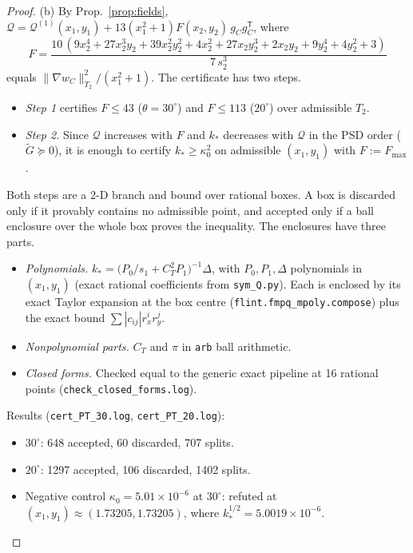 \documentclass[11pt]{article}
\theoremstyle{remark}
\begin{document}
\begin{proof}
(b) By Prop.~\ref{prop:fields}, $\mathcal Q=\mathcal Q^{(1)}(x_1,y_1)+13(x_1^2+1)F(x_2,y_2)\,g_Cg_C^{\mathsf T}$, where
\[
F=\frac{10\,(9x_2^4+27x_2^3y_2+39x_2^2y_2^2+4x_2^2+27x_2y_2^3+2x_2y_2+9y_2^4+4y_2^2+3)}{7\,s_2^3}
\]
equals $\|\nabla w_C\|^2_{T_2}/(x_1^2+1)$. The certificate has two steps.
\begin{itemize}
\item \emph{Step 1} certifies $F\le43$ ($\theta=30^\circ$) and $F\le113$ ($20^\circ$) over admissible $T_2$.
\item \emph{Step 2.} Since $\mathcal Q$ increases with $F$ and $k_\ast$ decreases with $\mathcal Q$ in the PSD order ($\tilde G\succeq0$), it is enough
 to certify $k_\ast\ge\kappa_0^2$ on admissible $(x_1,y_1)$ with $F:=F_{\max}$.
\end{itemize}
Both steps are a 2-D branch and bound over rational boxes. A box is discarded only if it provably contains no admissible point, and
accepted only if a ball enclosure over the whole box proves the inequality. The enclosures have three parts.
\begin{itemize}
\item \emph{Polynomials.} $k_\ast=\big(P_0/s_1+C_T^2P_1\big)^{-1}\Delta$, with $P_0,P_1,\Delta$ polynomials in $(x_1,y_1)$ (exact rational
 coefficients from \texttt{sym\_Q.py}). Each is enclosed by its exact Taylor expansion at the box centre (\texttt{flint.fmpq\_mpoly.compose}) plus the
 exact bound $\sum|c_{ij}|r_x^ir_y^j$.
\item \emph{Nonpolynomial parts.} $C_T$ and $\pi$ in \texttt{arb} ball arithmetic.
\item \emph{Closed forms.} Checked equal to the generic exact pipeline at 16 rational points (\texttt{check\_closed\_forms.log}).
\end{itemize}
Results (\texttt{cert\_PT\_30.log}, \texttt{cert\_PT\_20.log}):
\begin{itemize}
\item $30^\circ$: 648 accepted, 60 discarded, 707 splits.
\item $20^\circ$: 1297 accepted, 106 discarded, 1402 splits.
\item Negative control $\kappa_0=5.01\times10^{-6}$ at $30^\circ$: refuted at $(x_1,y_1)\approx(1.73205,1.73205)$, where $k_\ast^{1/2}=5.0019\times10^{-6}$.
\end{itemize}
\end{proof}
\end{document}
